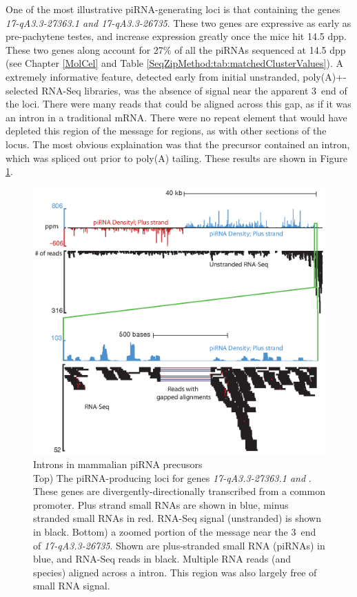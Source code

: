   One of the most illustrative piRNA-generating loci is that containing the genes \textit{17-qA3.3-27363.1 and 17-qA3.3-26735}. These two genes are expressive as early as pre-pachytene testes, and increase expression greatly once the mice hit 14.5 dpp. These two genes along account for 27\% of all the piRNAs sequenced at 14.5 dpp (see Chapter \ref{MolCel} and Table \ref{SeqZipMethod:tab:matchedClusterValues}). A extremely informative feature, detected early from initial unstranded, poly(A)+-selected RNA-Seq libraries, was the absence of signal near the apparent 3\textprime~end of the loci. There were many reads that could be aligned across this gap, as if it was an intron in a traditional mRNA. There were no repeat element that would have depleted this region of the message for regions, as with other sections of the locus. The most obvious explaination was that the precursor contained an intron, which was spliced out prior to poly(A) tailing. These results are shown in Figure \ref{SeqZipMethod:fig:no piRNAs within Precursor Introns}.

  \begin{figure} %
    \centering 
    \includegraphics{Figures/SeqZipMethod/noPiRNAswithinPrecusorIntrons.eps}
    \caption[Introns in mammalian piRNA precusors]
    {
      Introns in mammalian piRNA precusors\\[0.25cm]
      Top) The piRNA-producing loci for genes \textit{17-qA3.3-27363.1 and }. These genes are divergently-directionally transcribed from a common promoter. Plus strand small RNAs are shown in blue, minus stranded small RNAs in red. RNA-Seq signal (unstranded) is shown in black. Bottom) a zoomed portion of the message near the 3\textprime~end of \textit{17-qA3.3-26735}. Shown are plus-stranded small RNA (piRNAs) in blue, and RNA-Seq reads in black. Multiple RNA reads (and species) aligned across a intron. This region was also largely free of small RNA signal.
      }
    \label{SeqZipMethod:fig:no piRNAs within Precursor Introns}
    \end{figure}

